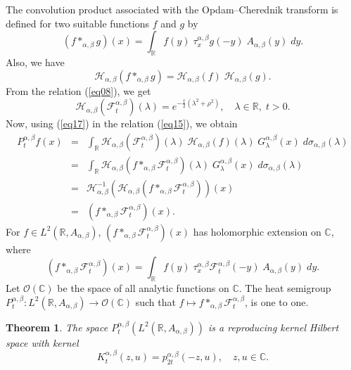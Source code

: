 \documentclass[a4paper,11pt, reqno]{amsart}
\theoremstyle{plain}
\newtheorem{theorem}{Theorem}[section]
\theoremstyle{definition}
\theoremstyle{remark}
\def \R{{\mathbb R}}
\def \C{{\mathbb C}}
\def\R{\mathbb R}
\def \H{{\mathcal H}}
\begin{document}
The convolution product associated with the Opdam--Cherednik transform is defined for two suitable functions $f$ and $g$  by \cite{ank12}
\[ (f *_{\alpha, \beta} g) (x)=\int_\R  f(y) \;\tau_x^{\alpha, \beta} g(-y) \; A_{\alpha, \beta}(y) \; dy.  \]
Also, we have
\begin{equation}\label{eq16}
\H_{\alpha, \beta} (f *_{\alpha, \beta} g)= \H_{\alpha, \beta} (f) \; \H_{\alpha, \beta} (g).
\end{equation}
From the relation (\ref{eq08}), we get
\begin{equation}\label{eq17}
\H_{\alpha, \beta} \left(\mathcal{F}_t^{\alpha, \beta} \right) (\lambda) =  e^{-\frac{t}{2}\left( \lambda^2 + \rho^2 \right)}, \quad \lambda \in \R, \; t>0.
\end{equation}
Now, using (\ref{eq17}) in the relation (\ref{eq15}), we obtain
\begin{eqnarray}\label{eq18}
P^{\alpha, \beta}_t f(x) 
& = &  \int_{\R} \H_{\alpha, \beta} \left(\mathcal{F}_t^{\alpha, \beta} \right) (\lambda) \;   \H_{\alpha, \beta} (f)(\lambda) \; G^{\alpha, \beta}_\lambda(x) \; d\sigma_{\alpha, \beta}(\lambda) \nonumber \\ 
& = & \int_{\R} \H_{\alpha, \beta} \left( f *_{\alpha, \beta} \mathcal{F}_t^{\alpha, \beta} \right) (\lambda) \; G^{\alpha, \beta}_\lambda(x) \; d\sigma_{\alpha, \beta}(\lambda) \nonumber \\ 
& = & \H_{\alpha, \beta}^{-1} \left( \H_{\alpha, \beta} \left( f *_{\alpha, \beta} \mathcal{F}_t^{\alpha, \beta} \right) \right) (x) \nonumber \\ 
& = & \left( f *_{\alpha, \beta} \mathcal{F}_t^{\alpha, \beta} \right) (x).
\end{eqnarray}
For $f \in  L^2(\R, A_{\alpha, \beta})$, $\left( f *_{\alpha, \beta} \mathcal{F}_t^{\alpha, \beta} \right) (x)$ has holomorphic extension on $\C$, where 
\[ \left( f *_{\alpha, \beta} \mathcal{F}_t^{\alpha, \beta} \right) (x) =\int_\R  f(y) \;\tau_x^{\alpha, \beta} \mathcal{F}_t^{\alpha, \beta}(-y) \; A_{\alpha, \beta}(y) \; dy. \]
Let $\mathcal{O}(\C) $ be the space of all analytic functions on $\C$. The heat semigroup $P^{\alpha, \beta}_t : L^2(\R, A_{\alpha, \beta}) \to \mathcal{O}(\C) $ such that $f \mapsto f *_{\alpha, \beta} \mathcal{F}_t^{\alpha, \beta}$, is one to one. 
\begin{theorem}\label{th5}
The space $P^{\alpha, \beta}_t \left( L^2(\R, A_{\alpha, \beta}) \right)$ is a reproducing kernel Hilbert space with kernel
\[ K^{\alpha, \beta}_t (z,u) = p^{\alpha, \beta}_{2t} (-z,u), \quad z,u \in \C. \]
\end{theorem}
\end{document}
